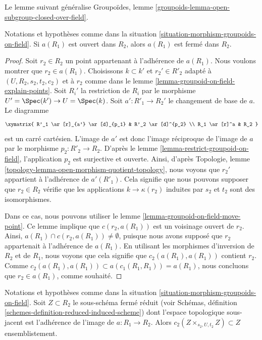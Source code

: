 \noindent
Le lemme suivant généralise
Groupoïdes, lemme \ref{groupoids-lemma-open-subgroup-closed-over-field}.

\begin{lemma}
\label{lemma-open-image-is-closed}
Notations et hypothèses comme dans la
situation \ref{situation-morphism-groupoids-on-field}.
Si $a(R_1)$ est ouvert dans $R_2$, alors $a(R_1)$ est fermé dans $R_2$.
\end{lemma}

\begin{proof}
Soit $r_2 \in R_2$ un point appartenant à l'adhérence de $a(R_1)$.
Nous voulons montrer que $r_2 \in a(R_1)$. Choisissons $k \subset k'$ et
$r_2' \in R'_2$ adapté à $(U, R_2, s_2, t_2, c_2)$ et à $r_2$ comme dans le
lemme \ref{lemma-groupoid-on-field-explain-points}.
Soit $R_i'$ la restriction de $R_i$ par le morphisme
$U' = \Spec(k') \to U = \Spec(k)$.
Soit $a' : R'_1 \to R_2'$ le changement de base de $a$. Le diagramme
$$
\xymatrix{
R'_1 \ar[r]_{a'} \ar[d]_{p_1} & R'_2 \ar[d]^{p_2} \\
R_1 \ar[r]^a & R_2
}
$$
est un carré cartésien. L'image de $a'$ est donc l'image réciproque de
l'image de $a$ par le morphisme $p_2 : R'_2 \to R_2$. D'après le
lemme \ref{lemma-restrict-groupoid-on-field},
l'application $p_2$ est surjective et ouverte. Ainsi, d'après
Topologie, lemme \ref{topology-lemma-open-morphism-quotient-topology},
nous voyons que $r_2'$ appartient à l'adhérence de $a'(R'_1)$.
Cela signifie que nous pouvons supposer que $r_2 \in R_2$ vérifie
que les applications $k \to \kappa(r_2)$ induites
par $s_2$ et $t_2$ sont des isomorphismes.

\medskip\noindent
Dans ce cas, nous pouvons utiliser le
lemme \ref{lemma-groupoid-on-field-move-point}.
Ce lemme implique que $c(r_2, a(R_1))$ est un voisinage ouvert de $r_2$.
Ainsi, $a(R_1) \cap c(r_2, a(R_1)) \not = \emptyset$, puisque nous avons supposé
que $r_2$ appartenait à l'adhérence de $a(R_1)$.
En utilisant les morphismes d'inversion de $R_2$ et de $R_1$, nous voyons que cela signifie que
$c_2(a(R_1), a(R_1))$ contient $r_2$.
Comme $c_2(a(R_1), a(R_1)) \subset a(c_1(R_1, R_1)) = a(R_1)$,
nous concluons que $r_2 \in a(R_1)$, comme souhaité.
\end{proof}

\begin{lemma}
\label{lemma-map-groupoids-on-field-image}
Notations et hypothèses comme dans la
situation \ref{situation-morphism-groupoids-on-field}.
Soit $Z \subset R_2$ le sous-schéma fermé réduit (voir
Schémas, définition \ref{schemes-definition-reduced-induced-scheme})
dont l'espace topologique sous-jacent est l'adhérence de l'image de
$a : R_1 \to R_2$. Alors
$c_2(Z \times_{s_2, U, t_2} Z) \subset Z$
ensemblistement.
\end{lemma}

